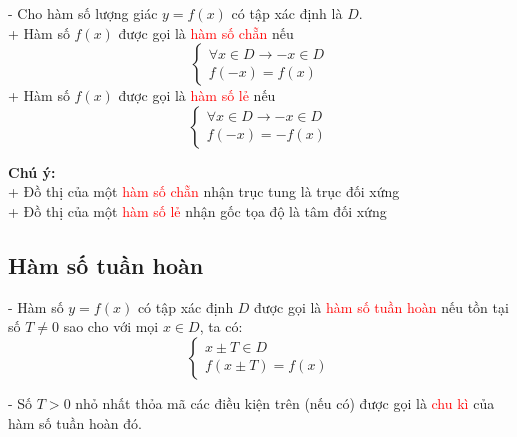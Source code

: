 - Cho hàm số lượng giác $y=f(x)$ có tập xác định là $D$.\\[6pt]
\hspace*{1.3cm}
+ Hàm số $f(x)$ được gọi là \textcolor{red}{hàm số chẵn} nếu
\[
    \begin{cases}
        \forall x \in D \rightarrow -x \in D \\
        f(-x) = f(x)
    \end{cases}
\]
\hspace*{1.3cm}
+ Hàm số $f(x)$ được gọi là \textcolor{red}{hàm số lẻ} nếu
\[
    \begin{cases}
        \forall x \in D \rightarrow -x \in D\\
        f(-x) = -f(x)
    \end{cases}
\]

\noindent\textbf{Chú ý:}\\
\hspace*{1cm}
+ Đồ thị của một \textcolor{red}{hàm số chẵn} nhận trục tung là trục đối xứng\\
\hspace*{1cm}
+ Đồ thị của một \textcolor{red}{hàm số lẻ} nhận gốc tọa độ là tâm đối xứng

\subsection{Hàm số tuần hoàn}
- Hàm số $y=f(x)$ có tập xác định $D$ được gọi là \textcolor{red}{hàm số tuần hoàn} nếu tồn tại số $T \neq 0$ sao cho với mọi $x \in D$, ta có:
\[
    \begin{cases}
        x \pm T \in D\\
        f(x \pm T) = f(x)
    \end{cases}
\]

- Số $T > 0$ nhỏ nhất thỏa mã các điều kiện trên (nếu có) được gọi là \textcolor{red}{chu kì} của hàm số tuần hoàn đó.

